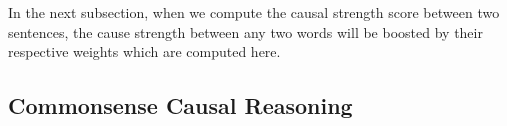 In the next subsection, when we compute the causal strength score between two sentences,
the cause strength between any two words will be boosted by their respective weights
which are computed here.
%
%
%
%
%

\subsection{Commonsense Causal Reasoning}

